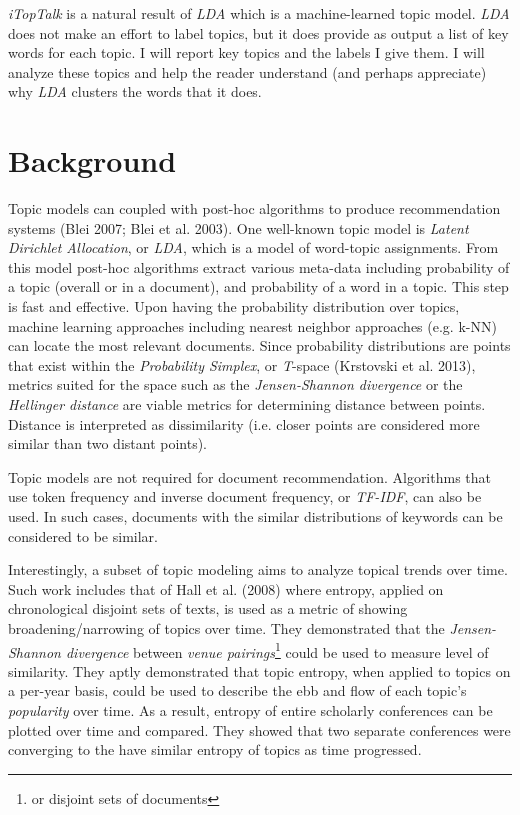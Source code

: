 \emph{iTopTalk} is a natural result of \emph{LDA} which is a machine-learned topic model. \emph{LDA} does not make an effort to label topics, but it does provide as output a list of key words for each topic. I will report key topics and the labels I give them. I will analyze these topics and help the reader understand (and perhaps appreciate) why \emph{LDA} clusters the words that it does. 

\section {Background}
Topic models can coupled with post-hoc algorithms to produce recommendation systems (Blei 2007; Blei et al. 2003). %
 One well-known topic model is \emph{Latent Dirichlet Allocation}, or \emph{LDA}, which is a model of word-topic assignments. From this model post-hoc algorithms extract various meta-data including probability of a topic (overall or in a document), and probability of a word in a topic. This step is fast and effective. Upon having the probability distribution over topics, machine learning approaches including nearest neighbor approaches (e.g. k-NN) can locate the most relevant documents. Since probability distributions are points that exist within the \textit{Probability Simplex}, or \emph{T}-space 
(Krstovski et al. 2013),  %
metrics suited for the space such as the \emph{Jensen-Shannon divergence} or the \emph{Hellinger distance} are viable metrics for determining distance between points. Distance is interpreted as dissimilarity (i.e. closer points are considered more similar than two distant points). 

Topic models are not required for document recommendation. Algorithms that use token frequency and inverse document frequency, or \emph{TF-IDF}, can also be used. In such cases, documents with the similar distributions of keywords can be considered to be similar. 


Interestingly, a subset of topic modeling aims to analyze topical trends over time. Such work includes that of Hall et al. (2008) %
where entropy, applied on chronological disjoint sets of texts, is used as a metric of showing broadening/narrowing of topics over time. They demonstrated that the \emph{Jensen-Shannon divergence} between \emph{venue pairings}\footnote{or disjoint sets of documents} could be used to measure level of similarity. They aptly demonstrated that topic entropy, when applied to topics on a per-year basis, could be used to describe the ebb and flow of each topic's \emph{popularity} over time. As a result, entropy of entire scholarly conferences can be plotted over time and compared. They showed that two separate conferences were converging to the have similar entropy of topics as time progressed.

